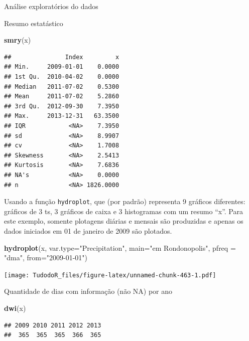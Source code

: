 \documentclass[
]{book}
\newenvironment{Shaded}{\begin{snugshade}}{\end{snugshade}}
\newcommand{\DataTypeTok}[1]{\textcolor[rgb]{0.13,0.29,0.53}{#1}}
\newcommand{\KeywordTok}[1]{\textcolor[rgb]{0.13,0.29,0.53}{\textbf{#1}}}
\newcommand{\NormalTok}[1]{#1}
\newcommand{\StringTok}[1]{\textcolor[rgb]{0.31,0.60,0.02}{#1}}
\begin{document}
Análise exploratórios do dados

Resumo estatástico

\begin{Shaded}
\begin{Highlighting}[]
\KeywordTok{smry}\NormalTok{(x)}
\end{Highlighting}
\end{Shaded}

\begin{verbatim}
##               Index         x
## Min.     2009-01-01    0.0000
## 1st Qu.  2010-04-02    0.0000
## Median   2011-07-02    0.5300
## Mean     2011-07-02    5.2860
## 3rd Qu.  2012-09-30    7.3950
## Max.     2013-12-31   63.3500
## IQR            <NA>    7.3950
## sd             <NA>    8.9907
## cv             <NA>    1.7008
## Skewness       <NA>    2.5413
## Kurtosis       <NA>    7.6836
## NA's           <NA>    0.0000
## n              <NA> 1826.0000
\end{verbatim}

Usando a função \texttt{hydroplot}, que (por padrão) representa 9 gráficos diferentes: gráficos de 3 ts, 3 gráficos de caixa e 3 histogramas com um resumo ``x''. Para este exemplo, somente plotagens diárias e mensais são produzidas e apenas os dados iniciados em 01 de janeiro de 2009 são plotados.

\begin{Shaded}
\begin{Highlighting}[]
\KeywordTok{hydroplot}\NormalTok{(x, }\DataTypeTok{var.type=}\StringTok{"Precipitation"}\NormalTok{, }\DataTypeTok{main=}\StringTok{"em Rondonopolis"}\NormalTok{,}
          \DataTypeTok{pfreq =} \StringTok{"dma"}\NormalTok{, }\DataTypeTok{from=}\StringTok{"2009-01-01"}\NormalTok{)}
\end{Highlighting}
\end{Shaded}

\texttt{[image: TudodoR\_files/figure-latex/unnamed-chunk-463-1.pdf]}

Quantidade de dias com informação (não NA) por ano

\begin{Shaded}
\begin{Highlighting}[]
\KeywordTok{dwi}\NormalTok{(x)}
\end{Highlighting}
\end{Shaded}

\begin{verbatim}
## 2009 2010 2011 2012 2013 
##  365  365  365  366  365
\end{verbatim}
\end{document}
